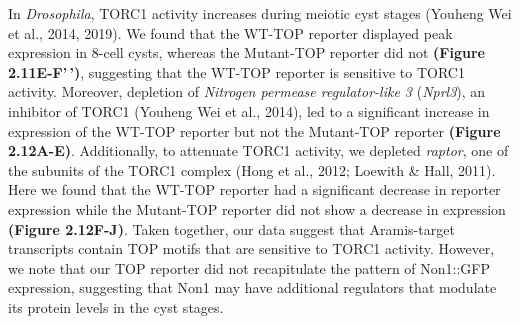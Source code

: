 \documentclass[12pt,oneside]{reedthesis}
\begin{document}
In \emph{Drosophila}, TORC1 activity increases during meiotic cyst stages (Youheng Wei et al., 2014, 2019). We found that the WT-TOP reporter displayed peak expression in 8-cell cysts, whereas the Mutant-TOP reporter did not \textbf{(Figure 2.11E-F'\,')}, suggesting that the WT-TOP reporter is sensitive to TORC1 activity. Moreover, depletion of \emph{Nitrogen permease regulator-like 3} (\emph{Nprl3}), an inhibitor of TORC1 (Youheng Wei et al., 2014), led to a significant increase in expression of the WT-TOP reporter but not the Mutant-TOP reporter \textbf{(Figure 2.12A-E)}. Additionally, to attenuate TORC1 activity, we depleted \emph{raptor}, one of the subunits of the TORC1 complex (Hong et al., 2012; Loewith \& Hall, 2011). Here we found that the WT-TOP reporter had a significant decrease in reporter expression while the Mutant-TOP reporter did not show a decrease in expression \textbf{(Figure 2.12F-J)}. Taken together, our data suggest that Aramis-target transcripts contain TOP motifs that are sensitive to TORC1 activity. However, we note that our TOP reporter did not recapitulate the pattern of Non1::GFP expression, suggesting that Non1 may have additional regulators that modulate its protein levels in the cyst stages.
\end{document}
